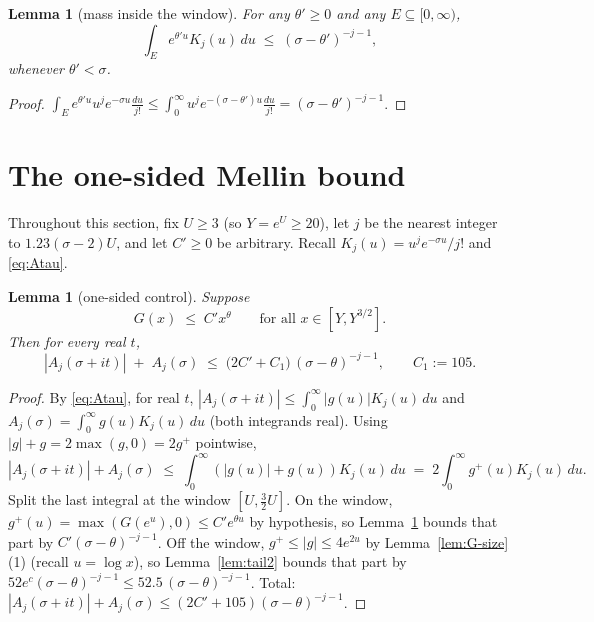\documentclass[11pt]{amsart}
\newtheorem{lemma}[theorem]{Lemma}
\numberwithin{equation}{section}
\newcommand{\Sig}{\sigma}
\begin{document}
\begin{lemma}[mass inside the window]\label{lem:inside}
For any $\theta' \ge 0$ and any $E \subseteq [0,\infty)$,
\[
\int_E e^{\theta' u} K_j(u)\,du \;\le\; (\Sig-\theta')^{-j-1},
\]
whenever $\theta' < \Sig$.
\end{lemma}

\begin{proof}
$\int_E e^{\theta'u}u^j e^{-\Sig u}\frac{du}{j!} \le \int_0^\infty
u^j e^{-(\Sig-\theta')u}\frac{du}{j!} = (\Sig-\theta')^{-j-1}$.
\end{proof}

\section{The one-sided Mellin bound}\label{sec:onesided}

Throughout this section, fix $U \ge 3$ (so $Y = e^U \ge 20$), let $j$ be
the nearest integer to $1.23(\Sig-2)U$, and let $C' \ge 0$ be arbitrary.
Recall $K_j(u) = u^j e^{-\Sig u}/j!$ and \eqref{eq:Atau}.

\begin{lemma}[one-sided control]\label{lem:onesided}
Suppose
\[
G(x) \;\le\; C' x^{\theta} \qquad \text{for all } x \in [Y, Y^{3/2}].
\]
Then for every real $t$,
\begin{equation}\label{eq:onesided}
|A_j(\Sig + it)| \;+\; A_j(\Sig)
\;\le\; \bigl(2C' + C_1\bigr)\,(\Sig-\theta)^{-j-1},
\qquad C_1 := 105.
\end{equation}
\end{lemma}

\begin{proof}
By \eqref{eq:Atau}, for real $t$,
$|A_j(\Sig+it)| \le \int_0^\infty |g(u)|K_j(u)\,du$ and
$A_j(\Sig) = \int_0^\infty g(u) K_j(u)\,du$ (both integrands real).
Using $|g| + g = 2\max(g, 0) = 2g^+$ pointwise,
\[
|A_j(\Sig+it)| + A_j(\Sig)
\;\le\; \int_0^\infty (|g(u)| + g(u))K_j(u)\,du
\;=\; 2\int_0^\infty g^+(u)K_j(u)\,du.
\]
Split the last integral at the window $[U, \tfrac32 U]$. On the window,
$g^+(u) = \max(G(e^u),0) \le C' e^{\theta u}$ by hypothesis, so
Lemma~\ref{lem:inside} bounds that part by $C'(\Sig-\theta)^{-j-1}$.
Off the window, $g^+ \le |g| \le 4e^{2u}$ by
Lemma~\ref{lem:G-size}(1) (recall $u = \log x$), so
Lemma~\ref{lem:tail2} bounds that part by
$52 e^{c}(\Sig-\theta)^{-j-1} \le 52.5\,(\Sig-\theta)^{-j-1}$.
Total: $|A_j(\Sig+it)| + A_j(\Sig) \le (2C' + 105)(\Sig-\theta)^{-j-1}$.
\end{proof}
\end{document}
